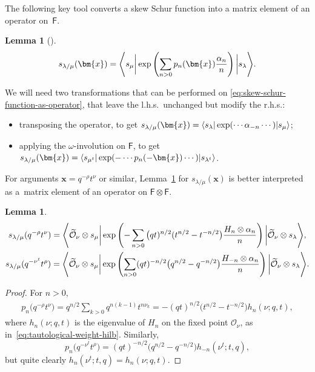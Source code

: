 \documentclass[pdftex]{sigma}%
\numberwithin{equation}{section}
\newtheorem{Lemma}[Theorem]{Lemma}
\renewcommand{\vec}[1]{\bm{#1}}
\renewcommand{\tilde}[1]{\widetilde{#1}}
\newcommand{\cO}{\mathcal{O}}
\newcommand{\sF}{\mathsf{F}}
\DeclarePairedDelimiter{\inner}{\langle}{\rangle}
\begin{document}
\begin{MyParagraph}
The following key tool converts a skew Schur function into a matrix
element of an operator on~$\sF$.

\begin{Lemma}[{\cite[Chapter~14]{Kac1990}}] \label{lem:skew-schur-function-as-operator}
 \begin{equation} \label{eq:skew-schur-function-as-operator}
 s_{\lambda/\mu}(\vec x) = \inner*{s_\mu \bigg| \exp\left(\sum_{n > 0} p_n(\vec x) \frac{\alpha_n}{n}\right) \bigg| s_\lambda}.
 \end{equation}
\end{Lemma}

We will need two transformations that can be performed on
\eqref{eq:skew-schur-function-as-operator}, that leave the l.h.s.\
unchanged but modify the r.h.s.:
\begin{itemize}\itemsep=0pt
\item transposing the operator, to get $s_{\lambda/\mu}(\vec x) =
 \inner*{s_\lambda | \exp(\cdots \alpha_{-n} \cdots) | s_\mu}$;
\item applying the $\omega$-involution on $\sF$, to get
 $s_{\lambda/\mu}(\vec x) = \inner*{s_{\mu^t} | \exp(-\cdots p_n(-\vec x)
 \cdots) | s_{\lambda^t}}$.
\end{itemize}
\end{MyParagraph}

\begin{MyParagraph}
For arguments $\vec x = q^{-\rho} t^\nu$ or similar,
Lemma~\ref{lem:skew-schur-function-as-operator} for
$s_{\lambda/\mu}(\vec x)$ is better interpreted as a~matrix element of
an operator on $\sF \otimes \sF$.

\begin{Lemma} \label{lem:skew-schur-function-as-operator-2}
 \begin{gather*}
 s_{\lambda/\mu}(q^{-\rho} t^{\nu}) = \inner*{\tilde\cO_\nu \otimes s_\mu \bigg| \exp\left(-\sum_{n > 0} \big(qt)^{n/2} (t^{n/2} - t^{-n/2}\big) \frac{H_n \otimes \alpha_n}{n}\right) \bigg| \tilde\cO_\nu \otimes s_\lambda}, \\
 s_{\lambda/\mu}(q^{-\nu^t} t^\rho) = \inner*{\tilde\cO_\nu \otimes s_\mu \bigg| \exp\left(\sum_{n > 0} (qt)^{-n/2} \big(q^{n/2} - q^{-n/2}\big) \frac{H_{-n} \otimes \alpha_n}{n}\right) \bigg| \tilde\cO_\nu \otimes s_\lambda}.
 \end{gather*}
\end{Lemma}

\begin{proof}
 For $n > 0$,
 \begin{gather*}
 p_n\big(q^{-\rho} t^{\nu}\big) = q^{n/2} \sum_{k>0} q^{n(k-1)} t^{n\nu_k} = -(qt)^{n/2} \big(t^{n/2} - t^{-n/2}\big) h_n(\nu;q,t),
 \end{gather*}
 where $h_n(\nu; q,t)$ is the eigenvalue of $H_n$ on the fixed point
 $\cO_\nu$, as in~\eqref{eq:tautological-weight-hilb}. Similarly,
 \[ p_n\big(q^{-\nu^t} t^\rho\big) = (qt)^{-n/2} \big(q^{n/2} - q^{-n/2}\big) h_{-n}(\nu^t;t,q), \]
 but quite clearly $h_n(\nu^t;t,q) = h_n(\nu;q,t)$.
\end{proof}
\end{MyParagraph}
\end{document}
